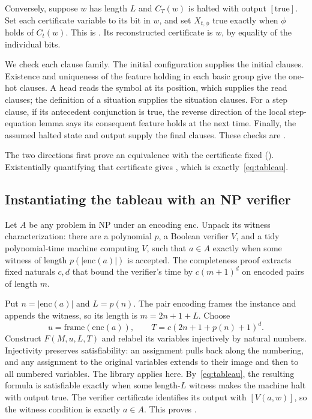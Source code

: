 Conversely, suppose $w$ has length $L$ and $C_T(w)$ is halted with output
$[\mathrm{true}]$. Set each certificate variable to its bit in $w$, and set
$X_{t,\phi}$ true exactly when $\phi$ holds of $C_t(w)$. This is
.
Its reconstructed certificate is $w$, by equality of the individual bits.

We check each clause family. The initial configuration supplies the initial
clauses. Existence and uniqueness of the feature holding in each basic group give
the one-hot clauses. A head reads the symbol at its position, which supplies the
read clauses; the definition of a situation supplies the situation clauses.
For a step clause, if its antecedent conjunction is true, the reverse direction
of the local step-equation lemma says its consequent feature holds at the next
time. Finally, the assumed halted state and output supply the final clauses.
These checks are
.

The two directions first prove an equivalence with the certificate fixed
(). Existentially quantifying that certificate gives
,
which is exactly~\eqref{eq:tableau}.

\subsection{Instantiating the tableau with an NP verifier}

Let $A$ be any problem in NP under an encoding $\mathrm{enc}$.
Unpack its witness characterization: there are a polynomial $p$, a Boolean
verifier $V$, and a tidy polynomial-time machine computing $V$, such that
$a\in A$ exactly when some witness of length $p(|\mathrm{enc}(a)|)$ is accepted.
The completeness proof extracts fixed naturals $c,d$ that bound the verifier's
time by $c(m+1)^d$ on encoded pairs of length $m$.

Put $n=|\mathrm{enc}(a)|$ and $L=p(n)$.
The pair encoding frames the instance and appends the witness, so its length is
$m=2n+1+L$. Choose
\[
 u=\mathrm{frame}(\mathrm{enc}(a)),\qquad
 T=c(2n+1+p(n)+1)^d.
\]
Construct $F(M,u,L,T)$ and relabel its variables injectively by natural numbers.
Injectivity preserves satisfiability: an assignment pulls back along the numbering,
and any assignment to the original variables extends to their image and then to
all numbered variables. The library applies  here.
By~\eqref{eq:tableau}, the resulting formula is satisfiable exactly when some
length-$L$ witness makes the machine halt with output true. The verifier certificate
identifies its output with $[V(a,w)]$, so the witness condition is exactly $a\in A$.
This proves
.

